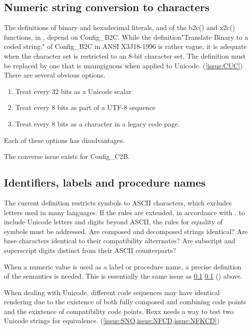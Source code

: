\documentclass[b4paper]{article}
\newcommand \fullcref [1]
   { \ifthenelse {\equal{\nameref{#1}}{}}
       {\cref{#1}}
       {\cref{#1} (\nameref{#1})}
   }
\begin{document}
\subsection{Numeric string conversion to characters}
\label{problem:numeric}
The definitions of binary and hexadecimal literals, and of the b2c()
and x2c() functions, in \cite{ANSI:J18}, depend on Config\_B2C. While the
definition"Translate Binary to a coded string." of Config\_B2C in ANSI
X3J18-1996 is rather vague, it is adequate when the character set is
restricted to an 8-bit character set.  The definition must be replaced
by one that is unamgiguous when applied to Unicode.
(\cref{issue:CUC}) There are several obvious options.

\begin{enumerate}
\item Treat every 32 bits as a Unicode scalar
\item Treat every 8 bits as part of a UTF-8 sequence
\item Treat every 8 bits as a character in a legacy code page.
\end{enumerate}

Each of these options has disadvantages.

The converse issue exists for Config\_C2B.

\subsection{Identifiers, labels and procedure names}
The current definition restricts symbols to ASCII characters, which
excludes letters used in many languages. If the rules are extended, in
accordance with \cite{UAX31}. to include Unicode letters and digits
beyond ASCII, the rules for equality of symbols must be addressed.
Are composed and decomposed strings identical? Are base characters
identical to their compatibility alterrnates? Are subscript and
superscript digits distinct from their ASCII counterparts?

When a numeric value is used as a label or procedure name, a precise
definition of the semantics is needed.  This is essentially the same
issue as \fullcref{problem:numeric} above.

When dealing with Unicode, different code sequences may have identical
rendering due to the existence of both fully composed and combining
code points and the exixtence of compatibility code points.
Rexx needs a way to test two Unicode strings for equivalence.
(\cref{issue:SNO,issue:NFCD,issue:NFKCD})
\end{document}
